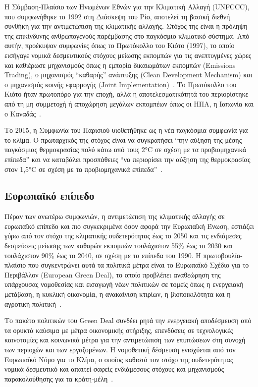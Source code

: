 Η Σύμβαση-Πλαίσιο των Ηνωμένων Εθνών για την Κλιματική Αλλαγή (UNFCCC), που συμφωνήθηκε το 1992 στη Διάσκεψη του Ρίο, αποτελεί τη βασική διεθνή συνθήκη για την αντιμετώπιση της κλιματικής αλλαγής. Στόχος της είναι η πρόληψη της επικίνδυνης ανθρωπογενούς παρέμβασης στο παγκόσμιο κλιματικό σύστημα. Από αυτήν, προέκυψαν συμφωνίες όπως το Πρωτόκολλο του Κιότο (1997), το οποίο εισήγαγε νομικά δεσμευτικούς στόχους μείωσης εκπομπών για τις ανεπτυγμένες χώρες και καθιέρωσε μηχανισμούς όπως η εμπορία δικαιωμάτων εκπομπών (Emissions Trading), ο μηχανισμός ``καθαρής'' ανάπτυξης (Clean Development Mechanism) και ο μηχανισμός κοινής εφαρμογής (Joint Implementation)~\cite{ypen-kyoto}. Το Πρωτόκολλο του Κιότο ήταν πρωτοπόρο για την εποχή, αλλά η αποτελεσματικότητά του περιορίστηκε από τη μη συμμετοχή ή αποχώρηση μεγάλων εκπομπέων όπως οι ΗΠΑ, η Ιαπωνία και ο Καναδάς~\cite{bassetti2022}.

Το 2015, η Συμφωνία του Παρισιού υιοθετήθηκε ως η νέα παγκόσμια συμφωνία για το κλίμα. Ο πρωταρχικός της στόχος είναι να συγκρατήσει ``την αύξηση της μέσης παγκόσμιας θερμοκρασίας πολύ κάτω από τους 2°C σε σχέση με τα προβιομηχανικά επίπεδα'' και να καταβάλει προσπάθειες ``να περιορίσει την αύξηση της θερμοκρασίας στον 1,5°C σε σχέση με τα προβιομηχανικά επίπεδα''~\cite{unfccc-paris}.

\subsection{Ευρωπαϊκό επίπεδο}
\label{subsec:european-level}

Πέραν των ανωτέρω συμφωνιών, η αντιμετώπιση της κλιματικής αλλαγής σε ευρωπαϊκό επίπεδο και πιο συγκεκριμένα όσον αφορά την Ευρωπαϊκή Ένωση, εστιάζει γύρω από τον στόχο της κλιματικής ουδετερότητας έως το 2050 και τις ενδιάμεσες δεσμεύσεις μείωσης των καθαρών εκπομπών τουλάχιστον 55\% έως το 2030 και τουλάχιστον 90\% έως το 2040, σε σχέση με τα επίπεδα του 1990. Η πρωτοβουλία-πλαίσιο που συγκεντρώνει αυτά τα πολιτικά μέτρα είναι το Ευρωπαϊκό Σχέδιο για το Περιβάλλον (European Green Deal), το οποίο προβλέπει αναθεώρηση της υπάρχουσας νομοθεσίας και εισαγωγή νέων πολιτικών σε τομείς όπως η ενεργειακή μετάβαση, η κυκλική οικονομία, η ανακαίνιση κτιρίων, η βιοποικιλότητα και η αγροτική πολιτική~\cite{ec-green-deal}.

Το πακέτο πολιτικών του Green Deal συνδέει ρητά την ενεργειακή αποδέσμευση από τα ορυκτά καύσιμα με μέτρα οικονομικής στήριξης, επενδύσεις σε τεχνολογικές καινοτομίες και κοινωνικά μέτρα για την αντιμετώπιση των επιπτώσεων στη συνοχή των περιοχών και των εργαζομένων. Η νομοθετική δέσμευση ενισχύεται από τον Ευρωπαϊκό Νόμο για το Κλίμα, ο οποίος καθιστά τον στόχο της ουδετερότητας νομικά δεσμευτικό και απαιτεί σαφείς ενδιάμεσους στόχους και μηχανισμούς παρακολούθησης για τα κράτη-μέλη~\cite{eu-climate-law}.

